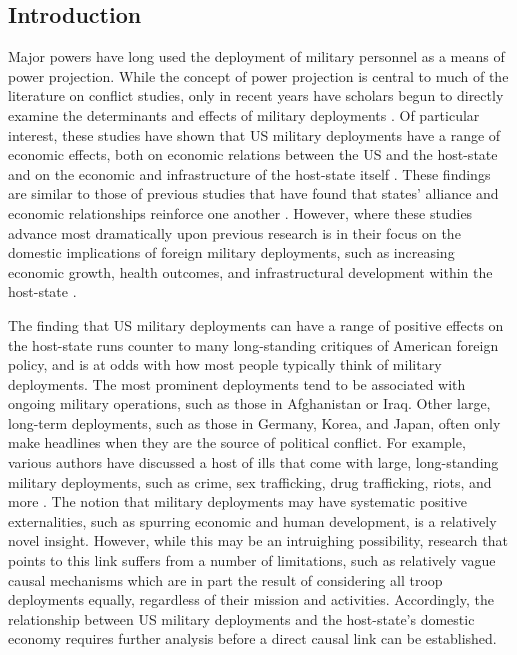 \documentclass[12pt]{article}
\begin{document}
\begin{doublespace}


\section{Introduction}

Major powers have long used the deployment of military personnel as a means of power projection. While the concept of power projection is central to much of the literature on conflict studies, only in recent years have scholars begun to directly examine the determinants and effects of military deployments \cite{biglaiser2007following,kane2012development,jones2012us,MMM2013,AllenFlynn2013,Allenetal2014,Allenetal2016,Braithwaite2015,Allenetal:2016apsa}. Of particular interest, these studies have shown that US military deployments have a range of economic effects, both on economic relations between the US and the host-state \cite{biglaiser2007following,biglaiser2009interdependence} and on the economic and infrastructure of the host-state itself \cite{kane2012development,jones2012us}. These findings are similar to those of previous studies that have found that states' alliance and economic relationships reinforce one another \cite{GowaMansfield1993,GowaMansfield2004,Fordham2008}. However, where these studies advance most dramatically upon previous research is in their focus on the domestic implications of foreign military deployments, such as increasing economic growth, health outcomes, and infrastructural development within the host-state \cite{jones2012us,kane2012development}.

The finding that US military deployments can have a range of positive effects on the host-state runs counter to many long-standing critiques of American foreign policy, and is at odds with how most people typically think of military deployments. The most prominent deployments tend to be associated with ongoing military operations, such as those in Afghanistan or Iraq. Other large, long-term deployments, such as those in Germany, Korea, and Japan, often only make headlines when they are the source of political conflict. For example, various authors have discussed a host of ills that come with large, long-standing military deployments, such as crime, sex trafficking, drug trafficking, riots, and more . The notion that military deployments may have systematic positive externalities, such as spurring economic and human development, is a relatively novel insight. However, while this may be an intruighing possibility, research that points to this link suffers from a number of limitations, such as relatively vague causal mechanisms which are in part the result of considering all troop deployments equally, regardless of their mission and activities. Accordingly, the relationship between US military deployments and the host-state's domestic economy requires further analysis before a direct causal link can be established.


\end{doublespace}
\end{document}
